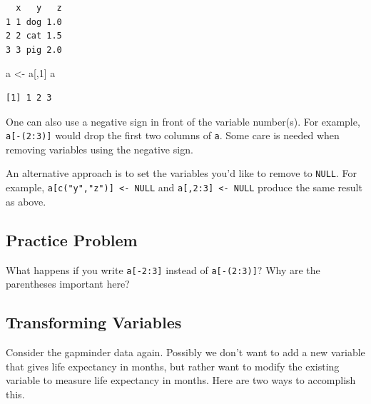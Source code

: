 \documentclass[
]{krantz}
\makeatletter
\newenvironment{Shaded}{\begin{snugshade}}{\end{snugshade}}
\newcommand{\DecValTok}[1]{\textcolor[rgb]{0.06,0.06,0.06}{#1}}
\newcommand{\KeywordTok}[1]{\textcolor[rgb]{0.27,0.27,0.27}{\textbf{#1}}}
\newcommand{\NormalTok}[1]{#1}
\newcommand{\OperatorTok}[1]{\textcolor[rgb]{0.43,0.43,0.43}{\textbf{#1}}}
\newcommand{\StringTok}[1]{\textcolor[rgb]{0.5,0.5,0.5}{#1}}
\newenvironment{kframe}{%
\medskip{}
\setlength{\fboxsep}{.8em}
 \def\at@end@of@kframe{}%
 \ifinner\ifhmode%
  \def\at@end@of@kframe{\end{minipage}}%
  \begin{minipage}{\columnwidth}%
 \fi\fi%
 \def\FrameCommand##1{\hskip\@totalleftmargin \hskip-\fboxsep
 \colorbox{shadecolor}{##1}\hskip-\fboxsep
     \hskip-\linewidth \hskip-\@totalleftmargin \hskip\columnwidth}%
 \MakeFramed {\advance\hsize-\width
   \@totalleftmargin\z@ \linewidth\hsize
   \@setminipage}}%
 {\par\unskip\endMakeFramed%
 \at@end@of@kframe}
\renewenvironment{Shaded}{\begin{kframe}}{\end{kframe}}
\makeatother
\begin{document}
\begin{verbatim}
  x   y   z
1 1 dog 1.0
2 2 cat 1.5
3 3 pig 2.0
\end{verbatim}

\begin{Shaded}
\begin{Highlighting}[]
\NormalTok{a \textless{}{-}}\StringTok{ }\NormalTok{a[,}\DecValTok{1}\NormalTok{]}
\NormalTok{a}
\end{Highlighting}
\end{Shaded}

\begin{verbatim}
[1] 1 2 3
\end{verbatim}

One can also use a negative sign in front of the variable number(s). For example, \texttt{a{[}-(2:3){]}} would drop the first two columns of \texttt{a}. Some care is needed when removing variables using the negative sign.

An alternative approach is to set the variables you'd like to remove to \texttt{NULL}. For example, \texttt{a{[}c("y","z"){]}\ \textless{}-\ NULL} and \texttt{a{[},2:3{]}\ \textless{}-\ NULL} produce the same result as above.

\hypertarget{ch6PP2}{%
\subsection{Practice Problem}\label{ch6PP2}}

What happens if you write \texttt{a{[}-2:3{]}} instead of \texttt{a{[}-(2:3){]}}? Why are the parentheses important here?

\hypertarget{transforming-variables}{%
\subsection{Transforming Variables}\label{transforming-variables}}

Consider the gapminder data again. Possibly we don't want to add a new variable that gives life expectancy in months, but rather want to modify the existing variable to measure life expectancy in months. Here are two ways to accomplish this.

\begin{Shaded}
\end{Shaded}
\end{document}
